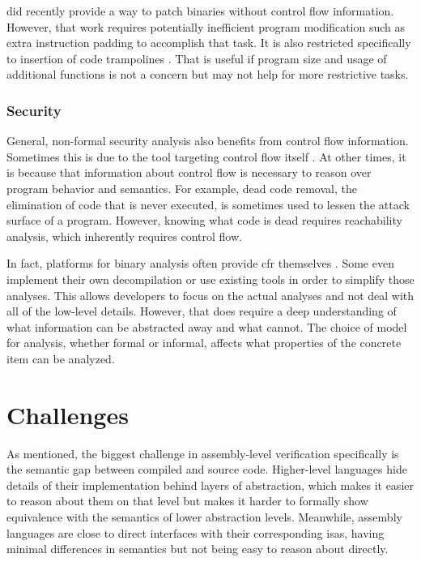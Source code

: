 \Textcite{duck2020binary} did recently provide a way to patch binaries without control flow information.
However, that work requires potentially inefficient program modification such as extra instruction padding to accomplish that task.
It is also restricted specifically to insertion of code trampolines \autocite{baker1995cons}.
That is useful if program size and usage of additional functions is not a concern but may not help for more restrictive tasks.

\subsubsection{Security}
General, non-formal security analysis also benefits from control flow information.
Sometimes this is due to the tool targeting control flow itself \autocite{kruegel2005automating,davi2009dynamic}.
At other times, it is because that information about control flow is necessary to reason over program behavior and semantics.
For example, dead code removal, the elimination of code that is never executed, is sometimes used to lessen the attack surface of a program.
However, knowing what code is dead requires reachability analysis, which inherently requires control flow.

In fact, platforms for binary analysis often provide \gls{cfr} themselves \autocite{song2008bitblaze,wang2017angr}.
Some even implement their own decompilation or use existing tools in order to simplify those analyses.
This allows developers to focus on the actual analyses and not deal with all of the low-level details.
However, that does require a deep understanding of what information can be abstracted away and what cannot.
The choice of model for analysis, whether formal or informal, affects what properties of the concrete item can be analyzed.

\section{Challenges}\label{challenges}
As mentioned, the biggest challenge in assembly-level verification specifically is the semantic gap between compiled and source code.
Higher-level languages hide details of their implementation behind layers of abstraction, which makes it easier to reason about them on that level but makes it harder to formally show equivalence with the semantics of lower abstraction levels.
Meanwhile, assembly languages are close to direct interfaces with their corresponding \glspl{isa}, having minimal differences in semantics but not being easy to reason about directly.

